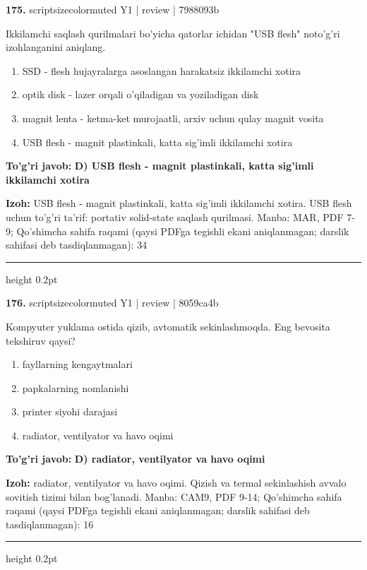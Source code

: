 \documentclass[10pt,a4paper]{article}
\begin{document}
{\bfseries\sffamily\color{ink} 175.} {scriptsizecolor{muted} Y1 | review | 7988093b}
\par
Ikkilamchi saqlash qurilmalari bo'yicha qatorlar ichidan "USB flesh" noto'g'ri izohlanganini aniqlang.
\begin{enumerate}[label=\Alph*),leftmargin=9mm]
\item SSD - flesh hujayralarga asoslangan harakatsiz ikkilamchi xotira
\item optik disk - lazer orqali o'qiladigan va yoziladigan disk
\item magnit lenta - ketma-ket murojaatli, arxiv uchun qulay magnit vosita
\item USB flesh - magnit plastinkali, katta sig'imli ikkilamchi xotira
\end{enumerate}
\begin{tcolorbox}[enhanced,breakable,colback=teal!4,colframe=teal!60!black,boxrule=0.45pt,arc=1.2mm,left=2.7mm,right=2.7mm,top=1.8mm,bottom=1.8mm,before skip=2mm,after skip=2mm]
{\bfseries\sffamily\color{teal}To'g'ri javob:} \textbf{D) USB flesh - magnit plastinkali, katta sig'imli ikkilamchi xotira}
\par\smallskip
{\bfseries Izoh:} USB flesh - magnit plastinkali, katta sig'imli ikkilamchi xotira. USB flesh uchun to'g'ri ta'rif: portativ solid-state saqlash qurilmasi. Manba: MAR, PDF 7-9; Qo'shimcha sahifa raqami (qaysi PDFga tegishli ekani aniqlanmagan; darslik sahifasi deb tasdiqlanmagan): 34
\end{tcolorbox}
\vspace{2mm}\hrule height 0.2pt\vspace{3mm}

{\bfseries\sffamily\color{ink} 176.} {scriptsizecolor{muted} Y1 | review | 8059ca4b}
\par
Kompyuter yuklama ostida qizib, avtomatik sekinlashmoqda. Eng bevosita tekshiruv qaysi?
\begin{enumerate}[label=\Alph*),leftmargin=9mm]
\item fayllarning kengaytmalari
\item papkalarning nomlanishi
\item printer siyohi darajasi
\item radiator, ventilyator va havo oqimi
\end{enumerate}
\begin{tcolorbox}[enhanced,breakable,colback=teal!4,colframe=teal!60!black,boxrule=0.45pt,arc=1.2mm,left=2.7mm,right=2.7mm,top=1.8mm,bottom=1.8mm,before skip=2mm,after skip=2mm]
{\bfseries\sffamily\color{teal}To'g'ri javob:} \textbf{D) radiator, ventilyator va havo oqimi}
\par\smallskip
{\bfseries Izoh:} radiator, ventilyator va havo oqimi. Qizish va termal sekinlashish avvalo sovitish tizimi bilan bog'lanadi. Manba: CAM9, PDF 9-14; Qo'shimcha sahifa raqami (qaysi PDFga tegishli ekani aniqlanmagan; darslik sahifasi deb tasdiqlanmagan): 16
\end{tcolorbox}
\vspace{2mm}\hrule height 0.2pt\vspace{3mm}
\end{document}
